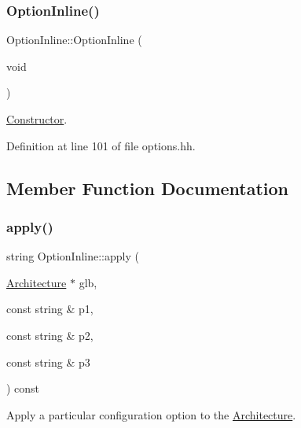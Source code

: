 \subsubsection{\texorpdfstring{OptionInline()}{OptionInline()}}
{\footnotesize\ttfamily Option\+Inline\+::\+Option\+Inline (\begin{DoxyParamCaption}\item[{void}]{ }\end{DoxyParamCaption})\hspace{0.3cm}{\ttfamily [inline]}}



\mbox{\hyperlink{class_constructor}{Constructor}}. 



Definition at line 101 of file options.\+hh.



\subsection{Member Function Documentation}
\mbox{\label{class_option_inline_aec2b4cc28f9de203dbc2ff8901c93dc8}} 
\subsubsection{\texorpdfstring{apply()}{apply()}}
{\footnotesize\ttfamily string Option\+Inline\+::apply (\begin{DoxyParamCaption}\item[{\mbox{\hyperlink{class_architecture}{Architecture}} $\ast$}]{glb,  }\item[{const string \&}]{p1,  }\item[{const string \&}]{p2,  }\item[{const string \&}]{p3 }\end{DoxyParamCaption}) const\hspace{0.3cm}{\ttfamily [virtual]}}



Apply a particular configuration option to the \mbox{\hyperlink{class_architecture}{Architecture}}. 

